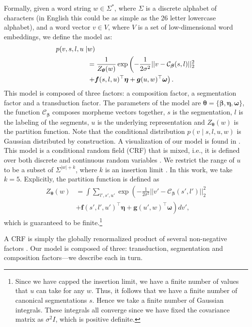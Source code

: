 \documentclass[11pt,letterpaper]{article}
\newcommand{\CC}{\mathcal{C}_{\vbeta}}
\renewcommand{\vec}{\boldsymbol}
\newcommand{\vtheta}{{\vec{\theta}}}
\newcommand{\vbeta}{{\vec{\beta}}}
\newcommand{\veta}{{\vec{\eta}}}
\newcommand{\vomega}{{\vec{\omega}}}
\newcommand{\vf}{{\vec{f}}}
\newcommand{\vg}{{\vec{g}}}
\newcommand{\vv}{v}
\begin{document}
Formally, given a word string $w \in
\Sigma^*$, where $\Sigma$ is a discrete alphabet of
characters 
(in English
this could be as simple as the 26 letter lowercase
alphabet), 
and a
word vector $v \in V$, where $V$ is a set of low-dimensional
word embeddings,
we define the model as:
\begin{align}\eqlabel{model}
  p(\vv, s, l, u \mid  &w)\nonumber\\
& = \frac{1}{Z_{\vtheta}(w)}\exp\left(-\frac{1}{2\sigma^2}||\vv -
  \CC(s, l) ||_2^2 \right.\nonumber \\
  &\left.+ \vf(s, l, u)^{\top} \veta + \vg(u, w)^{\top}\vomega \right).
\end{align}
This model is composed of three factors:
a composition factor, a segmentation factor and a transduction factor.
The parameters of the model are
$\vtheta = \{\vbeta, \veta, \vomega\}$,
the function $\mathcal{C}_{\vbeta}$ composes morpheme vectors together,
$s$ is the segmentation, $l$ is the labeling of the
segments, $u$ is the underlying representation and $Z_{\vtheta}(w)$ is the partition function.
Note that the conditional distribution $p(\vv \mid s, l, u, w)$ is Gaussian distributed by construction.
A visualization of our model is found in .
This model is a conditional random field (CRF) that is mixed, i.e., it
is defined over both discrete and continuous random variables
\cite{koller2009probabilistic}.  We restrict the range of $u$ to
be a subset of $\Sigma^{|w|+k}$, where $k$ is an insertion limit \cite{dreyer2011non}. In this work,
we take $k=5$. Explicitly, the partition function is defined as
\begin{align}
  Z_{\vtheta}(w) &= \int \sum_{l', s', u'}\exp\left(-\frac{1}{2\sigma^2}||\vv' -
  \CC(s', l')||_2^2  \right.\nonumber \\ &+ \left. \vf(s', l', u')^{\top} \veta + \vg(u', w)^{\top}\vomega \right) d\vv',
\end{align}
which is guaranteed to be finite.\footnote{Since we have capped the insertion limit,
  we have a finite number of values that $u$ can take  for any $w$. Thus, it follows
  that we have a finite number of canonical segmentations $s$. Hence
  we take a finite number of Gaussian integrals. These integrals all converge since
  we have fixed the covariance matrix as $\sigma^2I$, which is positive definite.}


A CRF is simply the globally renormalized product of several
non-negative factors \cite{sutton2006introduction}. 
Our model is composed of three: transduction, segmentation and
composition factors---we describe each in turn.
\end{document}
